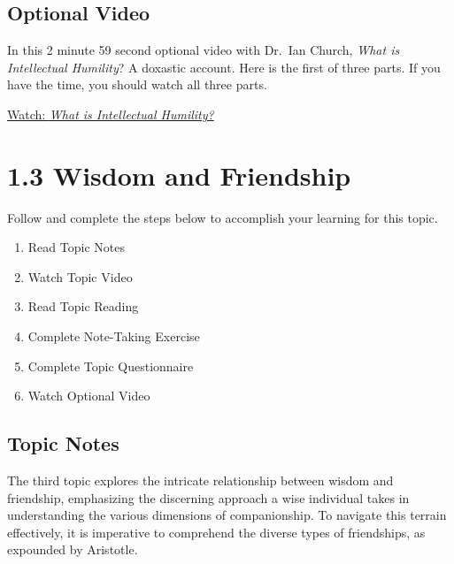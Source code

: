 \documentclass[
]{book}
\providecommand{\tightlist}{%
  \setlength{\itemsep}{0pt}\setlength{\parskip}{0pt}}
\begin{document}
\hypertarget{optional-video-1}{%
\subsection*{Optional Video}\label{optional-video-1}}

\begin{reflect}
In this 2 minute 59 second optional video with Dr.~Ian Church, \emph{What is Intellectual Humility}? A doxastic account. Here is the first of three parts. If you have the time, you should watch all three parts.

\href{https://www.youtube.com/watch?v=8CZIkGEJYRY}{Watch: \emph{What is Intellectual Humility?}}
\end{reflect}

\hypertarget{wisdom-and-friendship}{%
\section*{1.3 Wisdom and Friendship}\label{wisdom-and-friendship}}

Follow and complete the steps below to accomplish your learning for this topic.

\begin{enumerate}
\def\labelenumi{\arabic{enumi}.}
\tightlist
\item
  Read Topic Notes
\item
  Watch Topic Video
\item
  Read Topic Reading
\item
  Complete Note-Taking Exercise
\item
  Complete Topic Questionnaire
\item
  Watch Optional Video
\end{enumerate}

\hypertarget{topic-notes-2}{%
\subsection*{Topic Notes}\label{topic-notes-2}}

The third topic explores the intricate relationship between wisdom and friendship, emphasizing the discerning approach a wise individual takes in understanding the various dimensions of companionship. To navigate this terrain effectively, it is imperative to comprehend the diverse types of friendships, as expounded by Aristotle.
\end{document}
